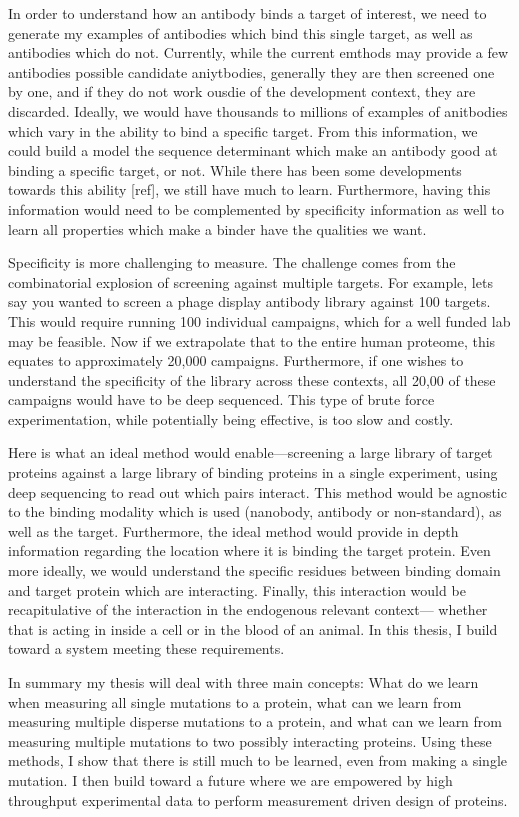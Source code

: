 In order to understand how an antibody binds a target of interest, we need to generate my examples of antibodies which bind this single target, as well as antibodies which do not. Currently, while the current emthods may provide a few antibodies possible candidate aniytbodies, generally they are then screened one by one, and if they do not work ousdie of the development context, they are discarded. Ideally, we would have thousands to millions of examples of anitbodies which vary in the ability to bind a specific target. From this information, we could build a model the sequence determinant which make an antibody good at binding a specific target, or not. While there has been  some developments towards this ability [ref], we still have much to learn. Furthermore, having this information would need to be complemented by specificity information as well to learn all properties which make a binder have the qualities we want. 

Specificity is more challenging to measure. The challenge comes from the combinatorial explosion of screening against multiple targets. For example, lets say you wanted to screen a phage display antibody library against 100 targets. This would require running 100 individual campaigns, which for a well funded lab may be feasible. Now if we extrapolate that to the entire human proteome, this equates to approximately 20,000 campaigns. Furthermore, if one wishes to understand the specificity of the library across these contexts, all 20,00 of these campaigns would have to be deep sequenced. This type of brute force experimentation, while potentially being effective, is too slow and costly. 

Here is what an ideal method would enable---screening a large library of target proteins against a large library of binding proteins in a single experiment, using deep sequencing to read out which pairs interact. This method would be agnostic to the binding modality which is used (nanobody, antibody or non-standard), as well as the target. Furthermore, the ideal method would provide in depth information regarding the location where it is binding the target protein. Even more ideally, we would understand the specific residues between binding domain and target protein which are interacting. Finally, this interaction would be recapitulative of the interaction in the endogenous relevant context--- whether that is acting in inside a cell or in the blood of an animal. In this thesis, I build toward a system meeting these requirements. 

In summary my thesis will deal with three main concepts: What do we learn when measuring all single mutations to a protein, what can we learn from measuring multiple disperse mutations to a protein, and what can we learn from measuring multiple mutations to two possibly interacting proteins. Using these methods, I show that there is still much to be learned, even from making a single mutation. I then build toward a future where we are empowered by high throughput experimental data to perform measurement driven design of proteins. 

